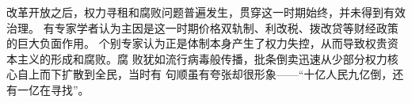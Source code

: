 改革开放之后，权力寻租和腐败问题普遍发生，贯穿这一时期始终，并未得到有效治理。
有专家学者认为主因是这一时期价格双轨制、利改税、拨改贷等财经政策的巨大负面作用。
个别专家认为正是体制本身产生了权力失控，从而导致权贵资本主义的形成和腐败。腐
败犹如流行病毒般传播，批条倒卖迅速从少部分权力核心自上而下扩散到全民，当时有
句顺虽有夸张却很形象——“十亿人民九亿倒，还有一亿在寻找”。


















